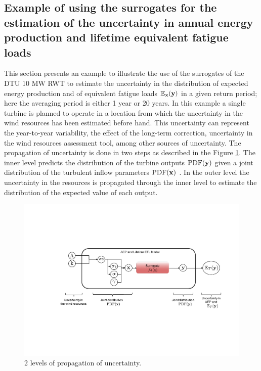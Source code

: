 \documentclass[preprint,12pt]{elsarticle}
\begin{document}

\subsection{Example of using the surrogates for the estimation of the  uncertainty in annual energy production and lifetime equivalent fatigue loads}
\label{subsec_Final_EX}

This section presents an example to illustrate the use of the surrogates of the DTU 10 MW RWT to estimate the uncertainty in the distribution of expected energy production and of equivalent fatigue loads $\mathbb{E}_{\mathbf{x}}(\mathbf{y})$ in a given return period; here the averaging period is either 1 year or 20 years. In this example a single turbine is planned to operate in a location from which the uncertainty in the wind resources has been estimated before hand. This uncertainty can represent the year-to-year variability, the effect of the long-term correction, uncertainty in the wind resources assessment tool, among other sources of uncertainty. The propagation of uncertainty is done in two steps as described in the Figure \ref{fig_2_UQ}. The inner level predicts the distribution of the turbine outputs $\mathrm{PDF}(\mathbf{y})$ given a joint distribution of the turbulent inflow parameters $\mathrm{PDF}(\mathbf{x})$ . In the outer level the uncertainty in the resources is propagated through the inner level to estimate the distribution of the expected value of each output.

\begin{figure}[h!]
\begin{centering}
\includegraphics[width=0.9\linewidth]{Figures/2level_propagation.pdf}
\caption{2 levels of propagation of uncertainty.}
\label{fig_2_UQ}
\end{centering}
\end{figure}
\end{document}

